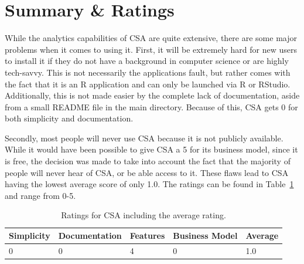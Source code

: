 \section{Summary \& Ratings}
While the analytics capabilities of CSA are quite extensive, there are some 
major problems when it comes to using it. First, it will be extremely 
hard for new users to install it if they do not have a background in computer 
science or are highly tech-savvy. This is not necessarily the applications 
fault, but rather comes with the fact that it is an R application and can only 
be launched via R or RStudio. Additionally, this is not made easier by the 
complete lack of documentation, aside from a small README file in the main 
directory. Because of this, CSA gets 0 for both simplicity and documentation.

Secondly, most people will never use CSA because it is not publicly available. 
While it would have been possible to give CSA a 5 for its business model, since 
it is free, the decision was made to take into account the fact that the 
majority of people will never hear of CSA, or be able access to it. These flaws 
lead to CSA having the lowest average score of only 1.0. The ratings can be
found in Table~\ref{tab:rating-CSA} and range from 0-5.





\begin{table}[tp] 
\centering 
\begin{tabularx}{\linewidth}{|X|X|X|X|X|}
\hline
Simplicity & Documentation & Features & Business Model & Average \\ 
\hline 
0 & 0 & 4 & 0 & 1.0 \\ 
\hline 
\end{tabularx} 
\caption[Ratings for CSA] {
Ratings for CSA including the average rating.
} 
\label{tab:rating-CSA}
\end{table}







